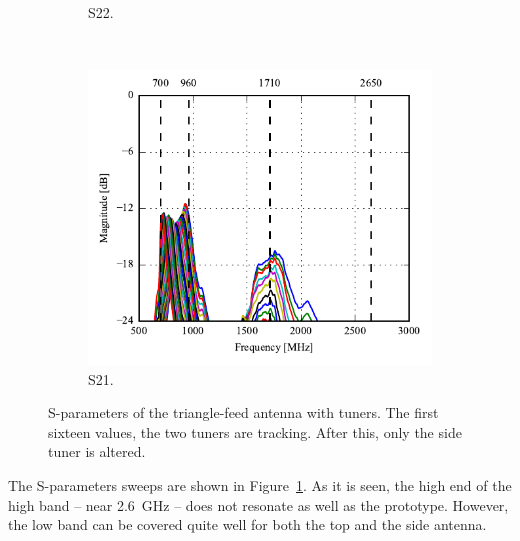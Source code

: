 \begin{figure}[htbp]
\begin{subfigure}{0.49\linewidth}
        \caption{S22.}
    \end{subfigure}
    \\
    \begin{subfigure}{0.49\linewidth}
         \includegraphics{img/tech_sol/pcb_trianglefeed/S21}
         \caption{S21.}
    \end{subfigure}
    \caption{S-parameters of the triangle-feed antenna with tuners. The first sixteen values, the two tuners are tracking. After this, only the side tuner is altered.}
    \label{fig:triang_pcb_sparams}
\end{figure}

The S-parameters sweeps are shown in Figure~\ref{fig:triang_pcb_sparams}. As it is seen, the high end of the high band -- near \SI{2.6}{GHz} -- does not resonate as well as the prototype. However, the low band can be covered quite well for both the top and the side antenna.

